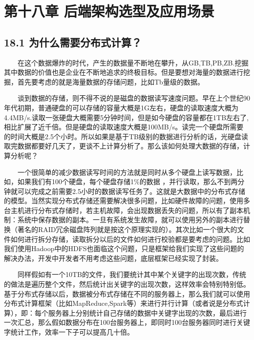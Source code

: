 \chapter{第十八章
后端架构选型及应用场景}\label{ux7b2cux5341ux516bux7ae0-ux540eux7aefux67b6ux6784ux9009ux578bux53caux5e94ux7528ux573aux666f}


\section{18.1
为什么需要分布式计算？}\label{ux4e3aux4ec0ux4e48ux9700ux8981ux5206ux5e03ux5f0fux8ba1ux7b97}

  在这个数据爆炸的时代，产生的数据量不断地在攀升，从GB,TB,PB,ZB.挖掘其中数据的价值也是企业在不断地追求的终极目标。但是要想对海量的数据进行挖掘，首先要考虑的就是海量数据的存储问题，比如Tb量级的数据。

  谈到数据的存储，则不得不说的是磁盘的数据读写速度问题。早在上个世纪90年代初期，普通硬盘的可以存储的容量大概是1G左右，硬盘的读取速度大概为4.4MB/s.读取一张硬盘大概需要5分钟时间，但是如今硬盘的容量都在1TB左右了,相比扩展了近千倍。但是硬盘的读取速度大概是100MB/s。读完一个硬盘所需要的时间大概是2.5个小时。所以如果是基于TB级别的数据进行分析的话，光硬盘读取完数据都要好几天了，更谈不上计算分析了。那么该如何处理大数据的存储，计算分析呢？

  一个很简单的减少数据读写时间的方法就是同时从多个硬盘上读写数据，比如，如果我们有100个硬盘，每个硬盘存储1\%的数据
，并行读取，那么不到两分钟就可以完成之前需要2.5小时的数据读写任务了。这就是大数据中的分布式存储的模型。当然实现分布式存储还需要解决很多问题，比如硬件故障的问题，使用多台主机进行分布式存储时，若主机故障，会出现数据丢失的问题，所以有了副本机制：系统中保存数据的副本。一旦有系统发生故障，就可以使用另外的副本进行替换（著名的RAID冗余磁盘阵列就是按这个原理实现的）。其次比如一个很大的文件如何进行拆分存储，读取拆分以后的文件如何进行校验都是要考虑的问题。比如我们使用Hadoop中的HDFS也面临这个问题，只是框架给我们实现了这些问题的解决办法，开发中开发者不用考虑这些问题，底层框架已经实现了封装。

  同样假如有一个10TB的文件，我们要统计其中某个关键字的出现次数，传统的做法是遍历整个文件，然后统计出关键字的出现次数，这样效率会特别特别低。基于分布式存储以后，数据被分布式存储在不同的服务器上，那么我们就可以使用分布式计算框架（比如MapReduce,Spark等）来进行并行计算（或者说是分布式计算），即：每个服务器上分别统计自己存储的数据中关键字出现的次数，最后进行一次汇总，那么假如数据分布在100台服务器上，即同时100台服务器同时进行关键字统计工作，效率一下子可以提高几十倍。


